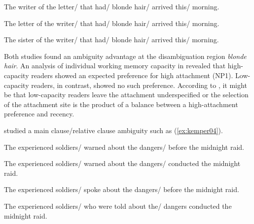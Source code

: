 \documentclass{cambridge7A}\usepackage[]{graphicx}\usepackage[]{color}
\begin{document}
\begin{exe}
\ex\label{ex:traxler07}
\begin{xlist}
\item The writer of the letter/ that had/ blonde hair/ arrived this/ morning.
\item The letter of the writer/ that had/ blonde hair/ arrived this/ morning.
\item The sister of the writer/ that had/ blonde hair/ arrived this/ morning.
\end{xlist}
\end{exe}

Both studies found an ambiguity advantage at the disambiguation region \textit{blonde hair}. An analysis of individual working memory capacity in \cite{Traxler2007} revealed that  high-capacity readers showed an expected preference for high attachment (NP1). 
Low-capacity readers, in contrast, showed no such preference. According to \cite{Traxler2007}, it might be that low-capacity readers leave the attachment underspecified or the selection of the attachment site is the product of a balance between a high-attachment preference and recency.




\cite{KemperCrowKemtes2004} studied a main clause/relative clause ambiguity such as (\ref{ex:kemper04}). 

\begin{exe}
\ex\label{ex:kemper04}
\begin{xlist}
\item The experienced soldiers/ warned about the dangers/ before the midnight raid.
\item The experienced soldiers/ warned about the dangers/ conducted the midnight raid.
\item The experienced soldiers/ spoke about the dangers/ before the midnight raid.
\item The experienced soldiers/ who were told about the/ dangers conducted the midnight raid.
\end{xlist}
\end{exe}
\end{document}

